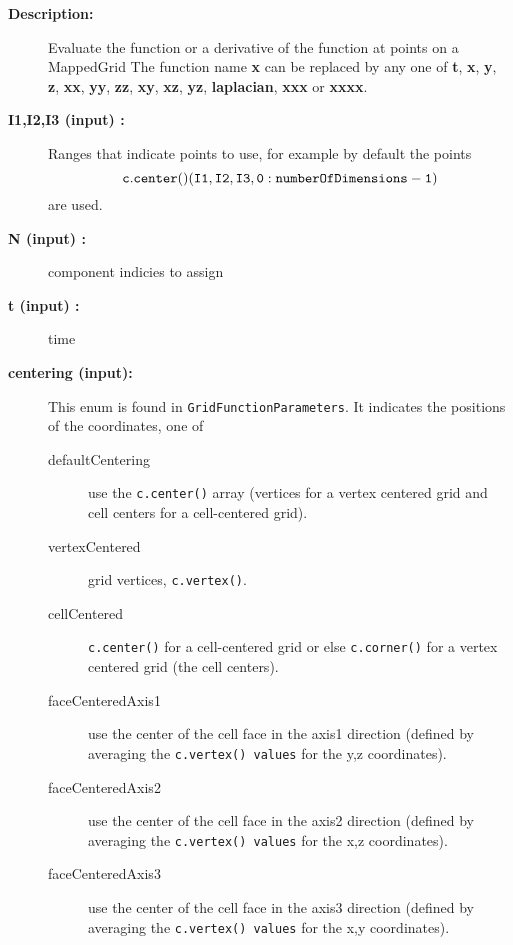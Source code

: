 \begin{description}
\item[{\bf Description:}]  Evaluate the function or a derivative of the function at points on a MappedGrid
    The function name {\bf x} can be replaced by any one of {\bf t}, {\bf x}, {\bf y}, {\bf z}, {\bf xx},
     {\bf yy}, {\bf zz}, {\bf xy}, {\bf xz}, {\bf yz}, {\bf laplacian}, {\bf xxx} or {\bf xxxx}.
\item[{\bf I1,I2,I3 (input) :}]  Ranges that indicate points to use, for example by default the
     points 
    \[ {\tt c.center()(I1,I2,I3,0:numberOfDimensions-1)} \]
     are used.
\item[{\bf N (input) :}]  component indicies to assign
\item[{\bf t (input) :}]  time
\item[{\bf centering (input):}]  This enum is found in {\tt GridFunctionParameters}.
       It indicates the positions of the coordinates, one of 
   \begin{description} 
    \item[defaultCentering] use the {\tt c.center()} array (vertices for a vertex centered grid
       and cell centers for a cell-centered grid).
    \item[vertexCentered] grid vertices, {\tt c.vertex()}.
    \item[cellCentered] {\tt c.center()} for a cell-centered grid or else {\tt c.corner()} for
        a vertex centered grid (the cell centers).
    \item[faceCenteredAxis1] use the center of the cell face in the axis1 direction (defined
       by averaging the {\tt c.vertex() values} for the y,z coordinates).
    \item[faceCenteredAxis2] use the center of the cell face in the axis2 direction (defined
       by averaging the {\tt c.vertex() values} for the x,z coordinates).
    \item[faceCenteredAxis3] use the center of the cell face in the axis3 direction (defined
       by averaging the {\tt c.vertex() values} for the x,y coordinates).
  \end{description}
\end{description}

